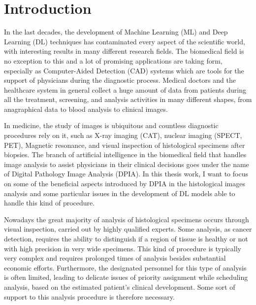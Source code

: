 \chapter*{Introduction}
\label{chap:intro}
In the last decades, the development of Machine Learning (ML) and Deep Learning (DL) techniques has contaminated every aspect of the scientific world, with interesting results in many different research fields. The biomedical field is no exception to this and a lot of promising applications are taking form, especially as Computer-Aided Detection (CAD) systems which are tools for the support of physicians during the diagnostic process. Medical doctors and the healthcare system in general collect a huge amount of data from patients during all the treatment, screening, and analysis activities in many different shapes, from anagraphical data to blood analysis to clinical images.

In medicine, the study of images is ubiquitous and countless diagnostic procedures rely on it, such as X-ray imaging (CAT), nuclear imaging (SPECT, PET), Magnetic resonance, and visual inspection of histological specimens after biopsies. The branch of artificial intelligence in the biomedical field that handles image analysis to assist physicians in their clinical decisions goes under the name of Digital Pathology Image Analysis (DPIA).
In this thesis work, I want to focus on some of the beneficial aspects introduced by DPIA in the histological images analysis and some particular issues in the development of DL models able to handle this kind of procedure.

Nowadays the great majority of analysis of histological specimens occurs through visual inspection, carried out by highly qualified experts. Some analysis, as cancer detection, requires the ability to distinguish if a region of tissue is healthy or not with high precision in very wide specimens. This kind of procedure is typically very complex and requires prolonged times of analysis besides substantial economic efforts. Furthermore, the designated personnel for this type of analysis is often limited, leading to delicate issues of priority assignment while scheduling analysis, based on the estimated patient's clinical development. Some sort of support to this analysis procedure is therefore necessary.

